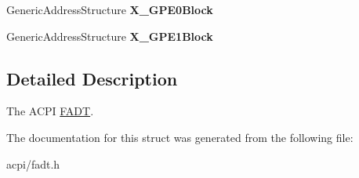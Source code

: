 \begin{DoxyCompactItemize}
\item 
Generic\+Address\+Structure {\bfseries X\+\_\+\+G\+P\+E0\+Block}\hypertarget{structFADT_a51acdac8c3be86bfdd6acc661f2c556d}{}\label{structFADT_a51acdac8c3be86bfdd6acc661f2c556d}

\item 
Generic\+Address\+Structure {\bfseries X\+\_\+\+G\+P\+E1\+Block}\hypertarget{structFADT_a6c5ee76cacde4e1261526108b5168048}{}\label{structFADT_a6c5ee76cacde4e1261526108b5168048}

\end{DoxyCompactItemize}


\subsection{Detailed Description}
The A\+C\+PI \hyperlink{structFADT}{F\+A\+DT}. 

The documentation for this struct was generated from the following file\+:\begin{DoxyCompactItemize}
\item 
acpi/fadt.\+h\end{DoxyCompactItemize}
